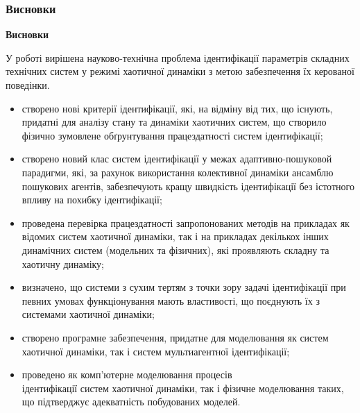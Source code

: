 \documentclass[14pt,handout,utf8]{beamer}
\newcommand{\Xhead}[1]{
 \begin{center}%
      \textbf{#1}%
 \end{center}%
}
\begin{document}
\begin{frame}
  \frametitle{Висновки}

  \Xhead{Висновки}

У роботі вирішена науково-технічна проблема ідентифікації параметрів складних технічних
систем у режимі хаотичної динаміки
з метою забезпечення їх керованої поведінки.

\begin{itemize}

  \item \justifying
    створено нові критерії ідентифікації, які, на відміну від тих, що
    існують, придатні для аналізу стану та динаміки
    хаотичних систем, що створило фізично зумовлене обґрунтування працездатності систем
    ідентифікації;

  \item \justifying
    створено новий клас систем ідентифікації у межах
    адаптивно-пошуковой парадигми,
    які, за рахунок використання колективної динаміки
    ансамблю пошукових агентів, забезпечують
    кращу швидкість ідентифікації без істотного впливу на похибку ідентифікації;

  \item \justifying
    проведена перевірка працездатності запропонованих методів
    на прикладах як відомих систем хаотичної динаміки,
    так і на прикладах декількох інших динамічних систем (модельних та фізичних),
    які проявляють складну та хаотичну динаміку;

  \item \justifying
   визначено, що системи з сухим тертям з точки зору задачі ідентифікації
   при певних  умовах функціонування
   мають властивості, що поєднують їх з системами хаотичної динаміки;

 \item \justifying
  створено програмне забезпечення, придатне для моделювання як систем
  хаотичної динаміки, так і систем мультиагентної ідентифікації;

  \item \justifying
  проведено як комп'ютерне моделювання процесів\\
  ідентифікації систем
  хаотичної динаміки, так і фізичне моделювання таких, що підтверджує адекватність
  побудованих моделей.


\end{itemize}

\end{frame}



%
%
%
\end{document}
